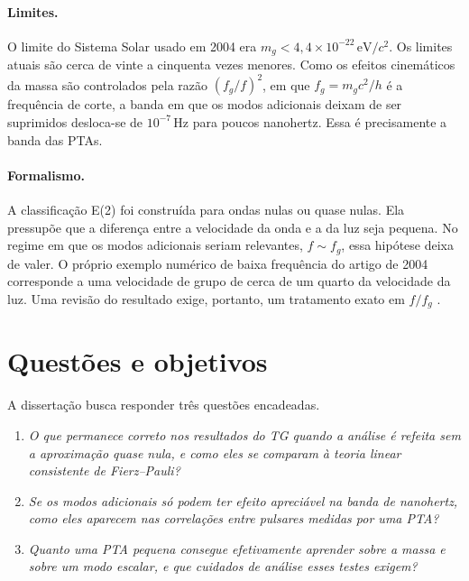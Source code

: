 \paragraph{Limites.} O limite do Sistema Solar usado em 2004 era
$m_g<4{,}4\times10^{-22}\,\mathrm{eV}/c^2$. Os limites atuais são cerca
de vinte a cinquenta vezes menores. Como os efeitos cinemáticos da massa
são controlados pela razão $(f_g/f)^2$, em que $f_g=m_gc^2/h$ é a
frequência de corte, a banda em que os modos adicionais deixam de ser
suprimidos desloca-se de $10^{-7}\,\mathrm{Hz}$ para poucos nanohertz.
Essa é precisamente a banda das PTAs.

\paragraph{Formalismo.} A classificação E(2) foi construída para ondas
nulas ou quase nulas. Ela pressupõe que a diferença entre a velocidade
da onda e a da luz seja pequena. No regime em que os modos adicionais
seriam relevantes, $f\sim f_g$, essa hipótese deixa de valer. O próprio
exemplo numérico de baixa frequência do artigo de 2004 corresponde a uma
velocidade de grupo de cerca de um quarto da velocidade da luz. Uma
revisão do resultado exige, portanto, um tratamento exato em $f/f_g$
\autocite{hyun2019}.

\section{Questões e objetivos}

A dissertação busca responder três questões encadeadas.

\begin{enumerate}
 \item[Q1.] \emph{O que permanece correto nos resultados do TG quando a
 análise é refeita sem a aproximação quase nula, e como eles se comparam
 à teoria linear consistente de Fierz--Pauli?}
 \item[Q2.] \emph{Se os modos adicionais só podem ter efeito apreciável
 na banda de nanohertz, como eles aparecem nas correlações entre
 pulsares medidas por uma PTA?}
 \item[Q3.] \emph{Quanto uma PTA pequena consegue efetivamente aprender
 sobre a massa e sobre um modo escalar, e que cuidados de análise esses
 testes exigem?}
\end{enumerate}

